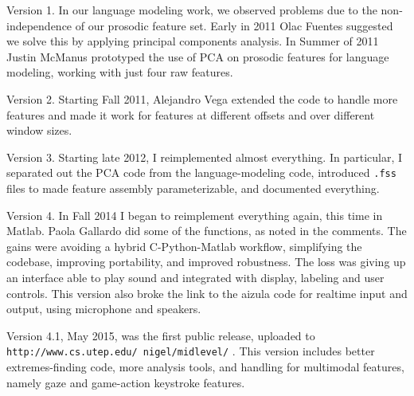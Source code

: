 \documentclass[11pt]{article}
\begin{document}
Version 1.  In our language  modeling work, we observed
problems due to the non-independence of our prosodic feature set.
Early in 2011 Olac Fuentes suggested we solve this by applying
principal components analysis.  In Summer of 2011 Justin McManus
prototyped the use of PCA on prosodic features for language modeling,
working with just four raw features.

Version 2. Starting Fall 2011, Alejandro Vega extended the code to
handle more features and made it work for features at different
offsets and over different window sizes.

Version 3. Starting late 2012, I reimplemented almost everything.  In
particular, I separated out the PCA code from the language-modeling
code, introduced {\tt .fss} files to made feature assembly
parameterizable, and documented everything.  

Version 4.  In Fall 2014 I began to reimplement everything again, this
time in Matlab.  Paola Gallardo did some of the functions, as noted in
the comments.  The gains were avoiding a hybrid C-Python-Matlab
workflow, simplifying the codebase, improving portability, and
improved robustness.  The loss was giving up an interface able to play
sound and integrated with display, labeling and user controls.  This
version also broke the link to the aizula code for realtime input and
output, using microphone and speakers.

Version 4.1, May 2015, was the first public release, uploaded to {\tt
  http://www.cs.utep.edu/ nigel/midlevel/} .  This version includes
better extremes-finding code, more analysis tools, and handling for
multimodal features, namely gaze and game-action keystroke features.
\end{document}
